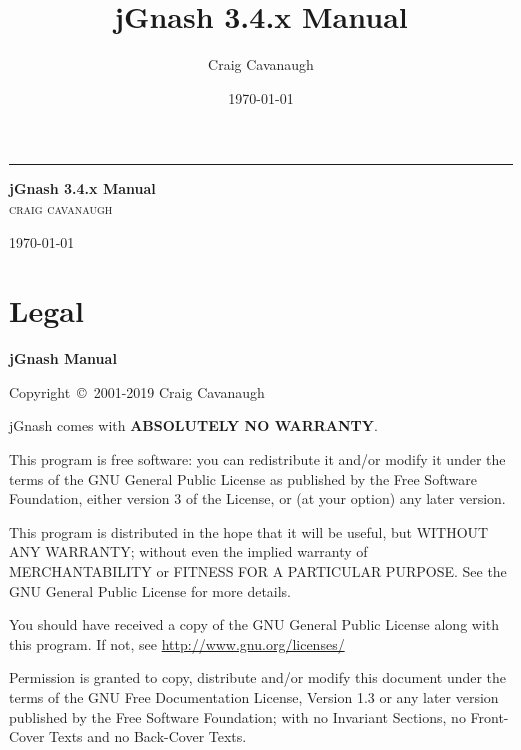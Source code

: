 \documentclass[letterpaper,12pt]{book}
\title{\textbf{jGnash 3.4.x Manual} }
\author{Craig Cavanaugh}
\date{\today}
\begin{document}
    \begin{titlepage}

        \raggedleft %

        {\color{gray} \rule{4pt}{\textheight}} %
        \hspace{0.08\textwidth} %
        \parbox[b]{0.75\textwidth}{ %

        {\Huge\bfseries jGnash 3.4.x Manual}\\[2\baselineskip] %
        {\Large\textsc{craig cavanaugh}}

        \vspace{0.5\textheight} %

        {\noindent \today}\\[\baselineskip] %
        }

    \end{titlepage}

    \tableofcontents
    
    \chapter{Legal}\label{ch:legal}
    {\bfseries jGnash Manual}

    Copyright~\copyright~2001-2019 Craig Cavanaugh

    jGnash comes with \textbf{ABSOLUTELY NO WARRANTY}.

    This program is free software: you can redistribute it and/or modify it under the terms of the GNU General Public
    License as published by the Free Software Foundation, either version 3 of the License, or (at your option) any later version.

    This program is distributed in the hope that it will be useful, but WITHOUT ANY WARRANTY; without even the implied
    warranty of MERCHANTABILITY or FITNESS FOR A PARTICULAR PURPOSE. See the GNU General Public License for more details.

    You should have received a copy of the GNU General Public License along with this program.
    If not, see \href{http://www.gnu.org/licenses/}{http://www.gnu.org/licenses/}

    Permission is granted to copy, distribute and/or modify this document under the terms of the GNU Free Documentation
    License, Version 1.3 or any later version published by the Free Software Foundation; with no Invariant Sections,
    no Front-Cover Texts and no Back-Cover Texts.
\end{document}
